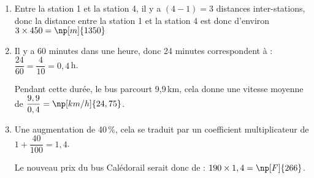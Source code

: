 
\medskip
\begin{enumerate}
	\item Entre la station 1 et la station 4, il y a $(4 - 1) = 3$ distances inter-stations, donc la distance entre la station 1 et la station 4 est donc d'environ $3\times 450 = \np[m]{1350}$
	
	\item Il y a 60 minutes dans une heure, donc 24 minutes correspondent à : $\dfrac{24}{60} = \dfrac{4}{10}=0,4$\,h.
	
Pendant cette durée, le bus parcourt 9,9\,km, cela donne une vitesse moyenne de $ \dfrac{9,9}{0,4} = \np[km/h]{24,75}$.
	
	\item Une augmentation de 40\,\%, cela se traduit par un coefficient multiplicateur de $1 + \dfrac{40}{100} = 1,4$.
	
Le nouveau prix du bus Calédorail serait donc de : $190\times 1,4 = \np[F]{266}$.
\end{enumerate}


